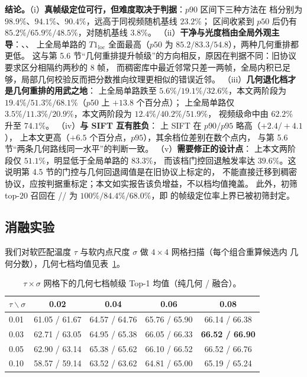 \textbf{结论。}（i）\textbf{真帧级定位可行，但难度取决于判据}：$p90$ 区间下三种方法在
 档分别为 $98.9\%$、$94.1\%$、$90.4\%$，远高于同视频随机基线 $23.2\%$；
区间收紧到 $p50$ 后仍有 $85.2\%/65.9\%/48.5\%$，对随机基线 $3.8\%$。
（ii）\textbf{干净与光度档由全局外观主导}：、、 上全局单路的
$T1_{\text{loc}}$ 全面最高（$p50$ 为 $85.2/83.3/54.8$），两种几何重排都更低。
这与第 5.6 节“几何重排提升帧级”的方向相反，原因在判据不同：旧协议要求区分相隔约两秒的 $8$ 帧，
而稠密库中最近邻常只差一两帧，全局内积已足够，局部几何校验反而把分数推向纹理更相似的错误近邻。
（iii）\textbf{几何退化档才是几何重排的用武之地}： 上全局单路跌至
$5.6\%/19.1\%/32.6\%$，本文两阶段为 $19.4\%/51.3\%/68.1\%$（$p50$ 上 $+13.8$ 个百分点）；
 上全局单路仅 $3.5\%/11.3\%/20.9\%$，本文两阶段为 $12.4\%/40.2\%/51.9\%$，
视频级命中由 $62.2\%$ 升至 $74.1\%$。
（iv）\textbf{与 SIFT 互有胜负}： 上 SIFT 在 $p90/p95$ 略高（$+2.4/+4.1$），
 上本文更高（$+6.5$ 个百分点，$p95$），其余档位差别在数个点内，
与第 5.6 节“两条几何路线同一水平”的判断一致。
（v）\textbf{需要修正的设计点}： 上本文两阶段仅 $51.1\%$，明显低于全局单路的 $83.3\%$，
而该档门控回退触发率达 $39.6\%$。这说明第 4.5 节的门控与几何回退阈值是在旧协议上标定的，
不能直接迁移到稠密协议，应按判据重标定；本文如实报告该负增益，不以档均值掩盖。
此外，初筛 top-$20$ 召回在 // 为
$100\%/84.4\%/68.0\%$，即  的帧级定位率上界已被初筛封定。

\subsection{消融实验}
\label{sec:ablation}

我们对软匹配温度 $\tau$ 与软内点尺度 $\sigma$ 做 $4\times4$ 网格扫描（每个组合重算候选内
几何分数），几何七档均值见表~\ref{tab:param}。

\begin{table}[t]
\centering
\caption{$\tau\times\sigma$ 网格下的几何七档帧级 Top-1 均值（纯几何 / 融合）。}
\label{tab:param}
\small
\begin{tabular}{lcccc}
\toprule
$\tau \backslash \sigma$ & 0.02 & 0.04 & 0.06 & 0.08 \\
\midrule
0.01 & 61.05 / 61.67 & 64.57 / 64.76 & 65.76 / 65.90 & 66.14 / 66.38 \\
0.03 & 62.71 / 63.05 & 64.95 / 65.38 & 66.05 / 66.33 & \textbf{66.52 / 66.90} \\
0.05 & 62.90 / 63.14 & 65.38 / 65.62 & 66.10 / 66.52 & 66.52 / 66.76 \\
0.10 & 58.57 / 59.14 & 63.52 / 63.62 & 64.81 / 65.00 & 65.19 / 65.24 \\
\bottomrule
\end{tabular}
\end{table}

